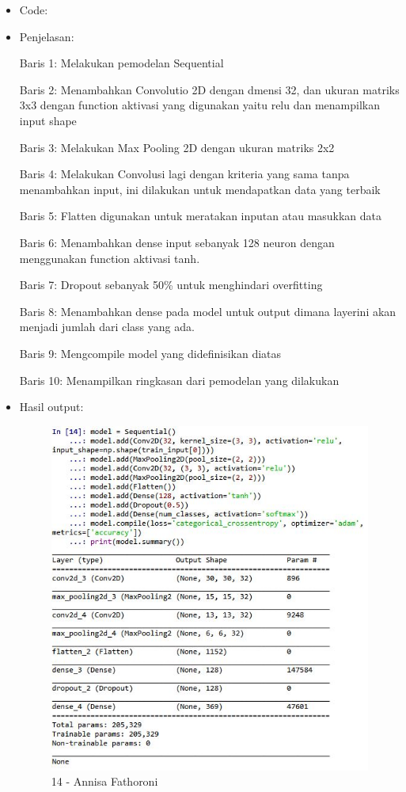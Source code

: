 \begin{itemize}
\item Code:


\item Penjelasan:

Baris 1: Melakukan pemodelan Sequential

Baris 2: Menambahkan Convolutio 2D dengan dmensi 32, dan ukuran matriks 3x3 dengan function aktivasi yang digunakan yaitu relu dan menampilkan input shape

Baris 3: Melakukan Max Pooling 2D dengan ukuran matriks 2x2

Baris 4: Melakukan Convolusi lagi dengan kriteria yang sama tanpa menambahkan input, ini dilakukan untuk mendapatkan data yang terbaik

Baris 5: Flatten digunakan untuk meratakan inputan atau masukkan data

Baris 6: Menambahkan dense input sebanyak 128 neuron dengan menggunakan function aktivasi tanh.

Baris 7: Dropout sebanyak 50\% untuk menghindari overfitting

Baris 8: Menambahkan dense pada model untuk output dimana layerini akan menjadi jumlah dari class yang ada.

Baris 9: Mengcompile model yang didefinisikan diatas

Baris 10: Menampilkan ringkasan dari pemodelan yang dilakukan

\item Hasil output:

\begin{figure}[!hbtp]
\centering
\includegraphics[scale=0.7]{figures/Chapter 7/1164067/Praktek/Chapter7AnnisaFathoroni14.jpg}
\caption{14 - Annisa Fathoroni}
\label{14 - Annisa Fathoroni}
\end{figure}


\end{itemize}
